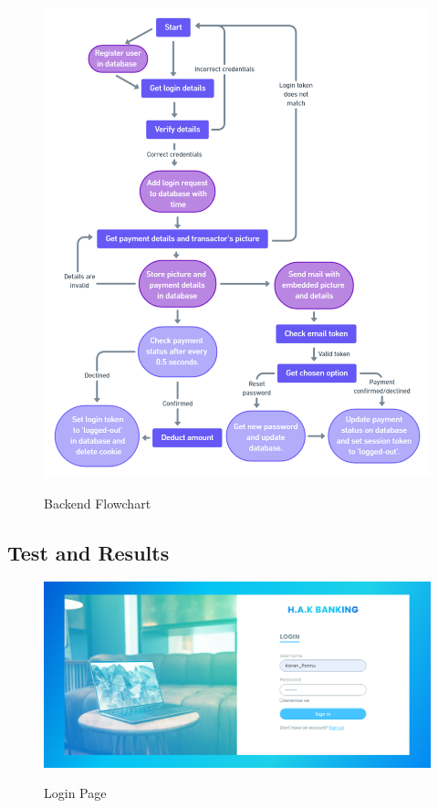 \documentclass[12pt, oneside, a4paper]{article}
\begin{document}
\begin{figure}[H]
\begin{center}
\includegraphics[width=1\textwidth]{Figure4.png}\\
\caption{Backend Flowchart}
\label{fig:Figure 6}
\end{center}
\end{figure}

\pagebreak


\subsection{Test and Results}
\vspace{0.5cm}
\begin{figure}[H]
\begin{center}
\includegraphics[width=1\textwidth]{Login.png}\\
\caption{Login Page}
\label{fig:Figure 7}
\end{center}
\end{figure}
\end{document}
